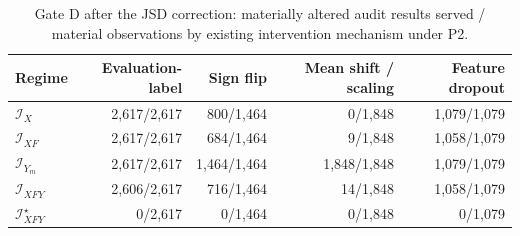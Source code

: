\begin{table}[!tbp]
\caption{Gate D after the JSD correction: materially altered audit results served / material observations by existing intervention mechanism under P2.}
\label{tab:s-policy-family}
\centering\scriptsize\setlength{\tabcolsep}{3pt}
\begin{tabular}{@{}lrrrr@{}}
\toprule
Regime & Evaluation-label & Sign flip & Mean shift / scaling & Feature dropout \\
\midrule
$\mathcal I_X$ & 2,617/2,617 & 800/1,464 & 0/1,848 & 1,079/1,079 \\
$\mathcal I_{XF}$ & 2,617/2,617 & 684/1,464 & 9/1,848 & 1,058/1,079 \\
$\mathcal I_{Y_m}$ & 2,617/2,617 & 1,464/1,464 & 1,848/1,848 & 1,079/1,079 \\
$\mathcal I_{XFY}$ & 2,606/2,617 & 716/1,464 & 14/1,848 & 1,058/1,079 \\
$\mathcal I_{XFY}^{\star}$ & 0/2,617 & 0/1,464 & 0/1,848 & 0/1,079 \\
\bottomrule
\end{tabular}
\end{table}
